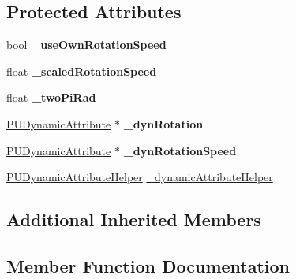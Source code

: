 \subsection*{Protected Attributes}
\begin{DoxyCompactItemize}
\item 
\mbox{\label{classPUTextureRotator_a8c6f1237f32ad29d13b4d37924d19e95}} 
bool {\bfseries \+\_\+use\+Own\+Rotation\+Speed}
\item 
\mbox{\label{classPUTextureRotator_a1fc72a2a396de7270e033c90b491beea}} 
float {\bfseries \+\_\+scaled\+Rotation\+Speed}
\item 
\mbox{\label{classPUTextureRotator_aafc07e16862c04c1570ff92840238885}} 
float {\bfseries \+\_\+two\+Pi\+Rad}
\item 
\mbox{\label{classPUTextureRotator_aced48f04cc4d71985f65f6a2de6ad54e}} 
\hyperlink{classPUDynamicAttribute}{P\+U\+Dynamic\+Attribute} $\ast$ {\bfseries \+\_\+dyn\+Rotation}
\item 
\mbox{\label{classPUTextureRotator_a5fa310d944f2b1e5fc5225640fdb3a89}} 
\hyperlink{classPUDynamicAttribute}{P\+U\+Dynamic\+Attribute} $\ast$ {\bfseries \+\_\+dyn\+Rotation\+Speed}
\item 
\hyperlink{classPUDynamicAttributeHelper}{P\+U\+Dynamic\+Attribute\+Helper} \hyperlink{classPUTextureRotator_aa24282dbcd3b88a10d78bafa5824840f}{\+\_\+dynamic\+Attribute\+Helper}
\end{DoxyCompactItemize}
\subsection*{Additional Inherited Members}


\subsection{Member Function Documentation}
\mbox{\label{classPUTextureRotator_a0996de4263c286d134d4efb7d0c84329}} 
